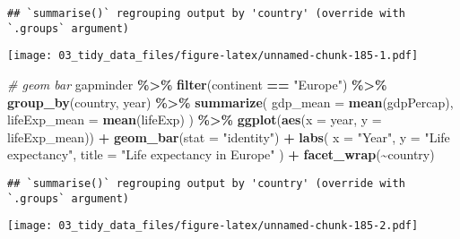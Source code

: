 \documentclass[
]{book}
\newenvironment{Shaded}{\begin{snugshade}}{\end{snugshade}}
\newcommand{\CommentTok}[1]{\textcolor[rgb]{0.56,0.35,0.01}{\textit{#1}}}
\newcommand{\DataTypeTok}[1]{\textcolor[rgb]{0.13,0.29,0.53}{#1}}
\newcommand{\KeywordTok}[1]{\textcolor[rgb]{0.13,0.29,0.53}{\textbf{#1}}}
\newcommand{\NormalTok}[1]{#1}
\newcommand{\OperatorTok}[1]{\textcolor[rgb]{0.81,0.36,0.00}{\textbf{#1}}}
\newcommand{\StringTok}[1]{\textcolor[rgb]{0.31,0.60,0.02}{#1}}
\begin{document}
\begin{verbatim}
## `summarise()` regrouping output by 'country' (override with `.groups` argument)
\end{verbatim}

\texttt{[image: 03\_tidy\_data\_files/figure-latex/unnamed-chunk-185-1.pdf]}

\begin{Shaded}
\begin{Highlighting}[]
\CommentTok{\# geom bar}
\NormalTok{gapminder }\OperatorTok{\%\textgreater{}\%}
\StringTok{  }\KeywordTok{filter}\NormalTok{(continent }\OperatorTok{==}\StringTok{ "Europe"}\NormalTok{) }\OperatorTok{\%\textgreater{}\%}
\StringTok{  }\KeywordTok{group\_by}\NormalTok{(country, year) }\OperatorTok{\%\textgreater{}\%}
\StringTok{  }\KeywordTok{summarize}\NormalTok{(}
    \DataTypeTok{gdp\_mean =} \KeywordTok{mean}\NormalTok{(gdpPercap),}
    \DataTypeTok{lifeExp\_mean =} \KeywordTok{mean}\NormalTok{(lifeExp)}
\NormalTok{  ) }\OperatorTok{\%\textgreater{}\%}
\StringTok{  }\KeywordTok{ggplot}\NormalTok{(}\KeywordTok{aes}\NormalTok{(}\DataTypeTok{x =}\NormalTok{ year, }\DataTypeTok{y =}\NormalTok{ lifeExp\_mean)) }\OperatorTok{+}
\StringTok{  }\KeywordTok{geom\_bar}\NormalTok{(}\DataTypeTok{stat =} \StringTok{"identity"}\NormalTok{) }\OperatorTok{+}
\StringTok{  }\KeywordTok{labs}\NormalTok{(}
    \DataTypeTok{x =} \StringTok{"Year"}\NormalTok{,}
    \DataTypeTok{y =} \StringTok{"Life expectancy"}\NormalTok{,}
    \DataTypeTok{title =} \StringTok{"Life expectancy in Europe"}
\NormalTok{  ) }\OperatorTok{+}
\StringTok{  }\KeywordTok{facet\_wrap}\NormalTok{(}\OperatorTok{\textasciitilde{}}\NormalTok{country)}
\end{Highlighting}
\end{Shaded}

\begin{verbatim}
## `summarise()` regrouping output by 'country' (override with `.groups` argument)
\end{verbatim}

\texttt{[image: 03\_tidy\_data\_files/figure-latex/unnamed-chunk-185-2.pdf]}
\end{document}

